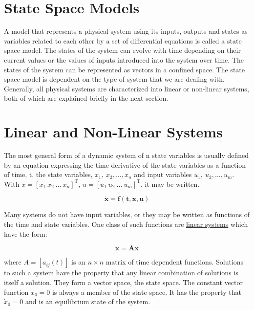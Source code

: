 \documentclass{UoNMCHA}
\numberwithin{equation}{section}
\begin{document}
\section{State Space Models}\label{State Space Models}

A model that represents a physical system using its inputs, outputs and states as variables related to each other by a set of differential equations is called a state space model. The states of the system can evolve with time depending on their current values or the values of inputs introduced into the system over time. The states of the system can be represented as vectors in a confined space. The state space model is dependent on the type of system that we are dealing with. Generally, all physical systems are characterized into linear or non-linear systems, both of which are explained briefly in the next section.


\section{Linear and Non-Linear Systems}\label{Linear and Non-Linear Systems}

The most general form of a dynamic system of n state variables is usually defined by an equation expressing the time derivative of the state variables as a function of time, t, the state variables, $x_1\mathrm{,\ }x_2, …, x_n$ and input variables $u_1\mathrm{,\ }u_2, …, u_m$. With $x=\left[x_1\mathrm{\ } x_2\mathrm{\ } \ldots\mathrm{\ } x_n\right]^\mathrm{T}$, $u=\left[u_1\mathrm{\ } u_2\mathrm{\ } \ldots\mathrm{\ } u_m\right]^\mathrm{T}$, it may be written. 

\begin{equation}
	\mathbf{\dot{x}=f(t,x,u)}
\end{equation}

Many systems do not have input variables, or they may be written as functions of the time and state variables. One class of such functions are \underline{linear systems} which have the form:

\begin{equation}
\mathbf{\dot{x}=Ax}
\end{equation}

where $A=\left[a_{ij}(t)\right]$ is an $n\times n$ matrix of time dependent functions. Solutions to such a system have the property that any linear combination of solutions is itself a solution. They form a vector space, the state space. The constant vector function $x_0=0$ is always a member of the state space. It has the property that ${\dot{x}}_0=0$ and is an equilibrium state of the system.
\end{document}
